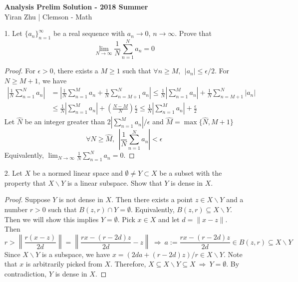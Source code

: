 
\begin{itemize}
	\begin{center}
		\Large{\textbf{Analysis Prelim Solution - 2018 Summer}}
		\normalsize{\\Yiran Zhu | Clemson - Math}
	\end{center}

	\item[1.] Let $\{a_n\}_{n=1}^\infty$ be a real sequence with $a_n \rightarrow 0$, $n \rightarrow \infty$. Prove that
	$$
	\lim_{N\rightarrow \infty} \frac{1}{N}\sum_{n=1}^Na_n = 0
	$$
 
	\begin{proof}
		For $\epsilon > 0$,  there exists a $M\ge 1$ such that $\forall n\ge M, ~~|a_n| \le \epsilon/2$. For $N\ge M+1$, we have 
		$$
		\begin{aligned}
		 \left\lvert\frac{1}{N}\sum_{n=1}^Na_n\right\rvert &=  \left\lvert\frac{1}{N}\sum_{n=1}^Ma_n + \frac{1}{N} \sum_{n=M+1}^Na_n\right\rvert \le \frac{1}{N}\left\lvert\sum_{n=1}^Ma_n \right\rvert + \frac{1}{N} \sum_{n=M+1}^N\left\lvert a_n\right\rvert  \\
		 &\le \frac{1}{N}\left\lvert\sum_{n=1}^Ma_n \right\rvert + \left(\frac{N-M}{N}\right)\frac{\epsilon}{2}\le \frac{1}{N}\left\lvert\sum_{n=1}^Ma_n \right\rvert + \frac{\epsilon}{2}
		\end{aligned}
		$$
		Let $\widehat{N}$ be an integer greater than $2\left\lvert\sum_{n=1}^Ma_n \right\rvert/\epsilon$ and $\widehat{M} = \max\{\widehat{N}, M+1\}$
		$$
		\forall N \ge \widehat{M}, ~~\left\lvert\frac{1}{N}\sum_{n=1}^Na_n\right\rvert < \epsilon
		$$
		Equivalently, $\lim_{N\rightarrow \infty} \frac{1}{N}\sum_{n=1}^Na_n = 0$.
	\end{proof}

	\item[2.] Let $X$ be a normed linear space and $\emptyset \neq Y\subset X$ be  a subset with the property that
	$X \backslash Y$ is a linear subspace. Show that $Y$ is dense in $X$.

	\begin{proof}
		 Suppose $Y$ is not dense in $X$. Then there exists a point $z\in X\backslash Y$ and a number $r > 0$ such that 
		 $B(z, r) \cap Y=\emptyset$. Equivalently, $B(z,r)\subseteq X\backslash Y$. Then we will show this implies $Y=\emptyset$. Pick $x\in X$ and let $d= \lVert x-z\rVert$. Then
		 $$
		 r>\left\lVert \frac{r(x-z)}{2d}  \right\rVert = \left\lVert \frac{rx- (r-2d)z}{2d} - z \right\rVert ~\Rightarrow~ a:=\frac{rx- (r-2d)z}{2d}\in B(z,r) \subseteq X\backslash Y
		 $$  
		 Since $X\backslash Y$ is a subspace, we have $x = (2da+(r-2d)z)/r \in X\backslash Y$. Note that $x$ is arbitrarily picked from $X$. Therefore, $X\subseteq X\backslash Y \subseteq X ~\Rightarrow~ Y = \emptyset$. By contradiction, $Y$ is dense in $X$.
	\end{proof}
	

\end{itemize}
